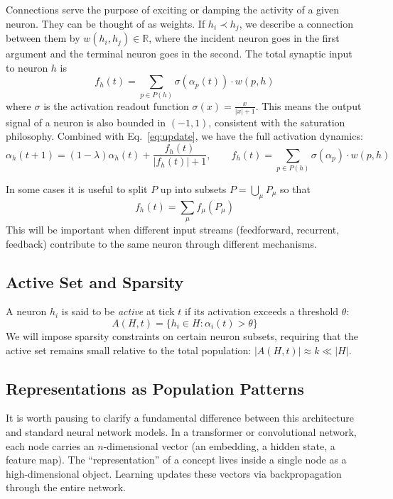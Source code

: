 \documentclass[11pt]{article}
\begin{document}
Connections serve the purpose of exciting or damping the activity of a given neuron. They can be thought of as weights. If $h_i \prec h_j$, we describe a connection between them by $w(h_i,h_j) \in \mathbb{R}$, where the incident neuron goes in the first argument and the terminal neuron goes in the second. The total synaptic input to neuron $h$ is
\begin{equation}
    f_h(t) = \sum_{p \in P(h)} \sigma(\alpha_p(t)) \cdot w(p, h)
\end{equation}
where $\sigma$ is the activation readout function $\sigma(x) = \frac{x}{|x|+1}$. This means the output signal of a neuron is also bounded in $(-1,1)$, consistent with the saturation philosophy. Combined with Eq.~\eqref{eq:update}, we have the full activation dynamics:
\begin{equation}\label{eq:full_dynamics}
    \alpha_h(t+1) = (1-\lambda)\alpha_h(t) + \frac{f_h(t)}{|f_h(t)|+1}, \qquad f_h(t) = \sum_{p \in P(h)} \sigma(\alpha_p) \cdot w(p,h)
\end{equation}

In some cases it is useful to split $P$ up into subsets $P = \bigcup_\mu P_\mu$ so that
\begin{equation}
    f_h(t) = \sum_\mu f_\mu(P_\mu)
\end{equation}
This will be important when different input streams (feedforward, recurrent, feedback) contribute to the same neuron through different mechanisms.

\subsection{Active Set and Sparsity}
A neuron $h_i$ is said to be \textit{active} at tick $t$ if its activation exceeds a threshold $\theta$:
\begin{equation}
    A(H, t) = \{h_i \in H : \alpha_i(t) > \theta \}
\end{equation}
We will impose sparsity constraints on certain neuron subsets, requiring that the active set remains small relative to the total population: $|A(H,t)| \approx k \ll |H|$.

\subsection{Representations as Population Patterns}
It is worth pausing to clarify a fundamental difference between this architecture and standard neural network models. In a transformer or convolutional network, each node carries an $n$-dimensional vector (an embedding, a hidden state, a feature map). The ``representation'' of a concept lives inside a single node as a high-dimensional object. Learning updates these vectors via backpropagation through the entire network.\\
\end{document}
